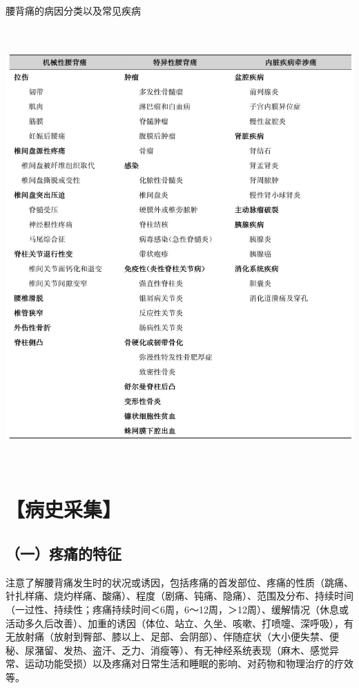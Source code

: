\begin{table}[htbp]
\centering
\caption{腰背痛的病因分类以及常见疾病}
\label{tab44-1}
\includegraphics[width=5.91667in,height=6.60417in]{./images/Image00265.jpg}
\end{table}

\section{【病史采集】}

\subsection{（一）疼痛的特征}

注意了解腰背痛发生时的状况或诱因，包括疼痛的首发部位、疼痛的性质（跳痛、针扎样痛、烧灼样痛、酸痛）、程度（剧痛、钝痛、隐痛）、范围及分布、持续时间（一过性、持续性；疼痛持续时间＜6周，6～12周，＞12周）、缓解情况（休息或活动多久后改善）、加重的诱因（体位、站立、久坐、咳嗽、打喷嚏、深呼吸），有无放射痛（放射到臀部、膝以上、足部、会阴部）、伴随症状（大小便失禁、便秘、尿潴留、发热、盗汗、乏力、消瘦等）、有无神经系统表现（麻木、感觉异常、运动功能受损）以及疼痛对日常生活和睡眠的影响、对药物和物理治疗的疗效等。

